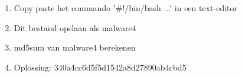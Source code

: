 \begin{enumerate}
  \item Copy paste het commando '\#!/bin/bash ...' in een text-editor
  \item Dit bestand opslaan als malware4
  \item md5sum van malware4 berekenen
  \item Oplossing: 340a4cc6d5f5d1542a8d27890ab4cbd5
\end{enumerate}